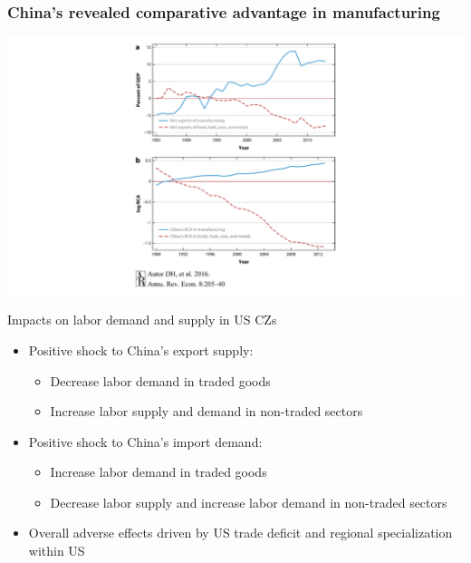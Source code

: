 \documentclass[notes=show]{beamer}
\begin{document}
\begin{frame}
\frametitle{China's revealed comparative advantage in manufacturing}
\begin{center}
\includegraphics[width=\textwidth]{AR-fig-3.pdf}%
\end{center}
\end{frame}

\begin{frame}{Impacts on labor demand and supply in US CZs}
\begin{itemize}
\item<1-> Positive shock to China’s export supply: \medskip
\begin{itemize}
    \item<1-> Decrease labor demand in traded goods \medskip
    \item<1-> Increase labor supply and demand in non-traded sectors \medskip
\end{itemize}
\item<1-> Positive shock to China’s import demand: \medskip
\begin{itemize}
    \item<1-> Increase labor demand in traded goods \medskip
    \item<1-> Decrease labor supply and increase labor demand in non-traded sectors \medskip
\end{itemize}
\item<1-> Overall adverse effects driven by US trade deficit and regional specialization within US
\end{itemize}
\end{frame}
\end{document}
